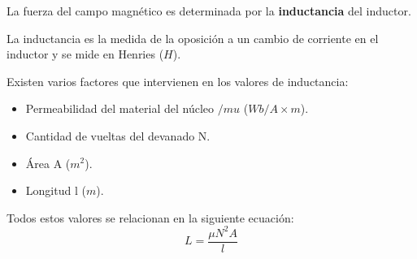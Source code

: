La fuerza del campo magnético es determinada por la \textbf{inductancia} del inductor.

La inductancia es la medida de la oposición a un cambio de corriente en el inductor y se mide en Henries ($H$).

Existen varios factores que intervienen en los valores de inductancia:
\begin{itemize}
	\item Permeabilidad del material del núcleo $/mu$ ($Wb/A\times m$).
	\item Cantidad de vueltas del devanado N.
	\item Área A ($m^{2}$).
	\item Longitud l ($m$).
\end{itemize}

Todos estos valores se relacionan en la siguiente ecuación:
\begin{equation}
	\label{eq:inductancia}
	L= \frac{\mu N^{2}A}{l}
\end{equation}
